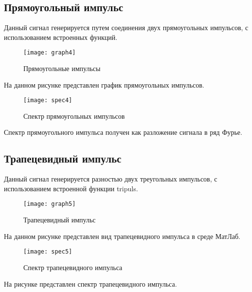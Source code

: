 \subsection{Прямоугольный импульс}


\parindent=1cm
Данный сигнал генерируется путем соединения двух прямоугольных импульсов, с использованием встроенных функций.

\begin{figure}[H]
	\begin{center}
		\texttt{[image: graph4]}
		\caption{Прямоугольные импульсы} 
		\label{pic:graph4} %
	\end{center}
\end{figure}
На данном рисунке представлен график прямоугольных импульсов.

\begin{figure}[H]
	\begin{center}
		\texttt{[image: spec4]}
		\caption{Спектр прямоугольных импульсов} 
		\label{pic:spec4} %
	\end{center}
\end{figure}
Спектр прямоугольного импульса получен как разложение сигнала в ряд Фурье.

\subsection{Трапецевидный импульс}


\parindent=1cm
Данный сигнал генерируется разностью двух треугольных импульсов, с использованием встроенной функции tripuls.

\begin{figure}[H]
	\begin{center}
		\texttt{[image: graph5]}
		\caption{Трапецевидный импульс} 
		\label{pic:graph5} %
	\end{center}
\end{figure}
На данном рисунке представлен вид трапецевидного импульса в среде МатЛаб.

\begin{figure}[H]
	\begin{center}
		\texttt{[image: spec5]}
		\caption{Спектр трапецевидного импульса} 
		\label{pic:spec5} %
	\end{center}
\end{figure}
На рисунке представлен спектр трапецевидного импульса.

